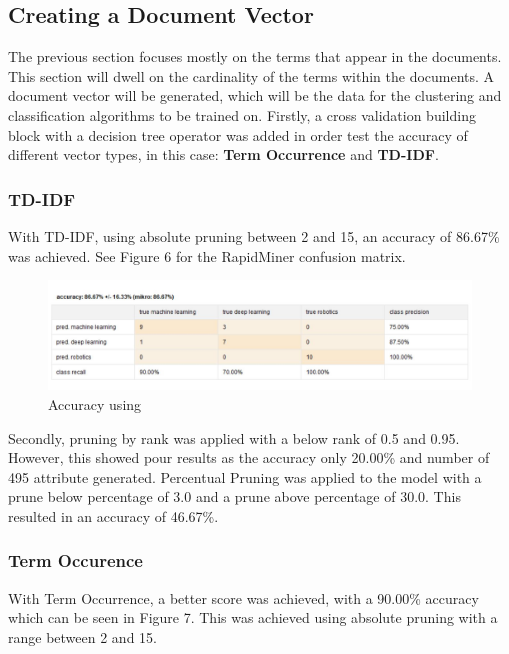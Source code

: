 \subsection*{Creating a Document Vector}
The previous section focuses mostly on the terms that appear in the documents. This section will dwell on the cardinality of the terms within the documents. A document vector will be generated, which will be the data for the clustering and classification algorithms to be trained on. Firstly, a cross validation building block with a decision tree operator was added in order test the accuracy of different vector types, in this case: \textbf{Term Occurrence} and \textbf{TD-IDF}. \\ 


\subsubsection*{TD-IDF}
With TD-IDF, using absolute pruning between 2 and 15, an accuracy of 86.67\% was achieved. See Figure 6 for the RapidMiner confusion matrix.

\begin{figure}[ht]
	\begin{center}
		\advance\leftskip-3cm
		\advance\rightskip-3cm
		\includegraphics[keepaspectratio=true,scale=0.6]{__resources/tdidf.JPG}
		\caption{Accuracy using }
		\label{stop}
	\end{center}
\end{figure} 
\newpage

Secondly, pruning by rank was applied with a below rank of 0.5 and 0.95. However, this showed pour results as the accuracy only 20.00\% and number of 495 attribute generated.
Percentual Pruning was applied to the model with a prune below percentage of 3.0 and a prune above percentage of 30.0. This resulted in an accuracy of 46.67\%.

\subsubsection*{Term Occurence}
With Term Occurrence, a better score was achieved, with a 90.00\% accuracy which can be seen in Figure 7. This was achieved using absolute pruning with a range between 2 and 15.


